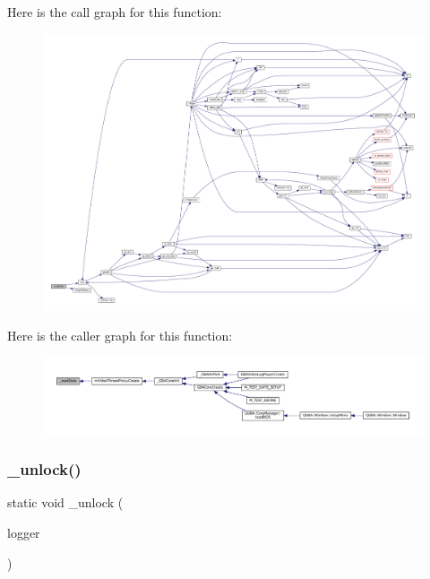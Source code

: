 Here is the call graph for this function\+:
\nopagebreak
\begin{figure}[H]
\begin{center}
\leavevmode
\includegraphics[width=350pt]{thread-proxy_8c_abcbab73349348e3342c1e7255ed55ee4_cgraph}
\end{center}
\end{figure}
Here is the caller graph for this function\+:
\nopagebreak
\begin{figure}[H]
\begin{center}
\leavevmode
\includegraphics[width=350pt]{thread-proxy_8c_abcbab73349348e3342c1e7255ed55ee4_icgraph}
\end{center}
\end{figure}
\mbox{\label{thread-proxy_8c_ade51ba82a597a9089d4e639a5fca76fa}} 
\subsubsection{\texorpdfstring{\+\_\+unlock()}{\_unlock()}}
{\footnotesize\ttfamily static void \+\_\+unlock (\begin{DoxyParamCaption}\item[{struct m\+Video\+Logger $\ast$}]{logger }\end{DoxyParamCaption})\hspace{0.3cm}{\ttfamily [static]}}

